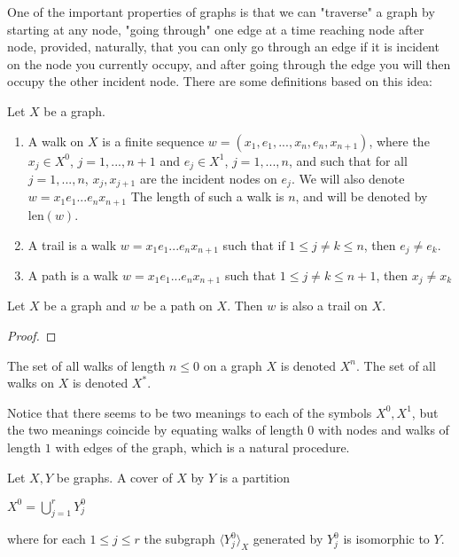 One of the important properties of graphs is that we can "traverse" a graph by starting at any node, "going through" one edge at a time reaching node after node, provided, naturally, that you can only go through an edge if it is incident on the node you currently occupy, and after going through the edge you will then occupy the other incident node. There are some definitions based on this idea:

\begin{definition}
	Let $X$ be a graph.
	
	\begin{enumerate}
		\item A walk on $X$ is a finite sequence $w = (x_1, e_1, ..., x_{n}, e_{n}, x_{n+1})$, where the $x_j \in X^0$, $j=1, ..., n+1$ and $e_j \in X^1$, $j=1, ..., n$, and such that for all $j=1,...,n$, $x_j, x_{j+1}$ are the incident nodes on $e_j$. We will also denote $w = x_1e_1...e_nx_{n+1}$ The length of such a walk is $n$, and will be denoted by $\text{len}(w)$.
		
		\item A trail is a walk $ w = x_1e_1...e_nx_{n+1}$ such that if $1 \leq j \neq k \leq n$, then $e_j \neq e_k$.
		
		\item A path is a walk $w = x_1e_1...e_nx_{n+1}$ such that $1 \leq j \neq k \leq n+1$, then $x_j \neq x_k$ 
	\end{enumerate}
\end{definition}

\begin{lemma}
	Let $X$ be a graph and $w$ be a path on $X$. Then $w$ is also a trail on $X$.
\end{lemma}

\begin{proof}
	
	
\end{proof}

\begin{definition}
	The set of all walks of length $n \leq 0$ on a graph $X$ is denoted $X^n$. The set of all walks on $X$ is denoted $X^*$.
\end{definition}

Notice that there seems to be two meanings to each of the symbols $X^0, X^1$, but the two meanings coincide by equating walks of length $0$ with nodes and walks of length $1$ with edges of the graph, which is a natural procedure.

\begin{definition}
	Let $X, Y$ be graphs. A cover of $X$ by $Y$ is a partition 
	
	\begin{center}
		$X^0=\bigcup_{j=1}^r Y^0_j$
	\end{center}
	
	\noindent where for each $1 \leq j \leq r$ the subgraph $\langle Y^0_j \rangle_X$ generated by $Y_j^0$ is isomorphic to $Y$.
\end{definition}

